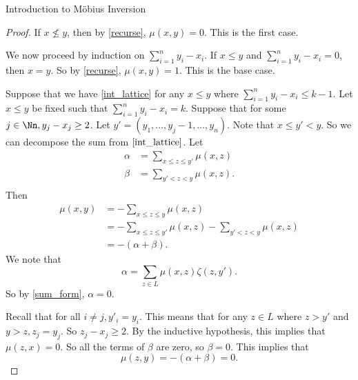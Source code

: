 \documentclass[12pt]{pom_thesis}
\begin{document}
\begin{chapter}{Introduction to M\"obius Inversion}
\begin{proof}
If $x \nleq y$, then by \ref{recurse}, $\mu(x,y) = 0$. This is the first case.

We now proceed by induction on $\sum_{i=1}^ny_i-x_i$. If $x \leq y$ and $\sum_{i=1}^ny_i-x_i = 0$, then $x = y$. So by \ref{recurse}, $\mu(x,y) = 1$. This is the base case.

Suppose that we have \ref{int_lattice} for any $x \leq y$ where $\sum_{i=1}^ny_i-x_i \leq k-1$. Let $x \leq y$ be fixed such that $\sum_{i=1}^ny_i-x_i =k$. Suppose that for some $j \in \Nn, y_j-x_j \geq 2$. Let $y' = (y_1,\dots,y_j-1,\dots,y_n)$. Note that $x \leq y' < y$. So we can decompose the sum from $\ref{int_lattice}$. Let
\begin{align*}
\alpha &= \sum_{x \leq z \leq y'} \mu(x,z)\\
\beta &= \sum_{y' < z < y}\mu(x,z).\\
\end{align*}
Then
\begin{align*}
\mu(x,y) &= -\sum_{x \leq z \leq y}\mu(x,z)\\
&= -\sum_{x \leq z \leq y'} \mu(x,z) - \sum_{y' < z < y}\mu(x,z)\\
&= -(\alpha + \beta).
\end{align*}
We note that
\[\alpha = \sum_{z \in L} \mu(x,z)\zeta(z,y').
\]
So by \ref{sum_form}, $\alpha=0$. 

Recall that for all $i \neq j, y'_i = y_i$. This means that for any $z \in L$ where $z>y'$ and $y > z, z_j = y_j$. So $z_j-x_j \geq 2$. By the inductive hypothesis, this implies that $\mu(z,x)=0$. So all the terms of $\beta$ are zero, so $\beta=0$. This implies that \[\mu(z,y)=-(\alpha+\beta)=0.\]


\end{proof}
\end{chapter}
\end{document}
